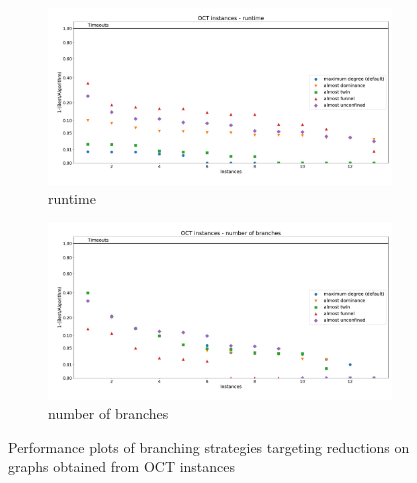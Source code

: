 \documentclass[12pt,a4paper,twoside]{scrartcl}
\numberwithin{equation}{section}
\begin{document}
\begin{figure}[hbt!]
	\begin{subfigure}{1\textwidth}
		\includegraphics[width=\textwidth]{images/plots/a2_oct_t}
		\caption{runtime}
	\end{subfigure}
	\begin{subfigure}{1\textwidth}
		\includegraphics[width=\textwidth]{images/plots/a2_oct_b}
		\caption{number of branches}
	\end{subfigure}
	\caption{Performance plots of branching strategies targeting reductions on graphs obtained from OCT instances}
\end{figure}
\end{document}
